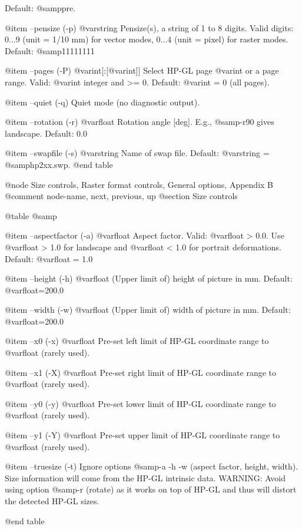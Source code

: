 Default: @samp{pre}.

@item --pensize (-p) @var{string}
Pensize(s), a string of 1 to 8 digits.
Valid digits: 0...9 (unit = 1/10 mm) for vector modes,
0...4 (unit = pixel) for raster modes. Default: @samp{11111111}

@item --pages (-P) @var{int}[:[@var{int}]]
Select HP-GL page @var{int} or a page range.
Valid: @var{int} integer and >= 0. Default: @var{int} = 0 (all pages).

@item --quiet (-q)
Quiet mode (no diagnostic output).

@item --rotation (-r) @var{float}
Rotation angle [deg]. E.g., @samp{-r90} gives landscape. Default: 0.0

@item --swapfile (-s) @var{string}
Name of swap file. Default: @var{string} = @samp{hp2xx.swp}.
@end table



@node Size controls, Raster format controls, General options, Appendix B
@comment  node-name,  next,  previous,  up
@section Size controls

@table @samp

@item --aspectfactor (-a) @var{float}
Aspect factor. Valid: @var{float} > 0.0. Use @var{float} > 1.0 for landscape
and @var{float} < 1.0 for portrait deformations. Default: @var{float} = 1.0

@item --height (-h) @var{float}
(Upper limit of) height of picture in mm. Default: @var{float}=200.0

@item --width (-w) @var{float}
(Upper limit of) width of picture in mm. Default: @var{float}=200.0

@item --x0 (-x) @var{float}
Pre-set left limit of HP-GL coordinate range to @var{float} (rarely used).

@item --x1 (-X) @var{float}
Pre-set right limit of HP-GL coordinate range to @var{float} (rarely used).

@item --y0 (-y) @var{float}
Pre-set lower limit of HP-GL coordinate range to @var{float} (rarely used).

@item --y1 (-Y) @var{float}
Pre-set upper limit of HP-GL coordinate range to @var{float} (rarely used).

@item --truesize (-t)
Ignore options @samp{-a -h -w} (aspect factor, height, width). Size information
will come from the HP-GL intrinsic data. WARNING: Avoid using option @samp{-r}
(rotate) as it works on top of HP-GL and thus will distort the detected HP-GL
sizes.

@end table



